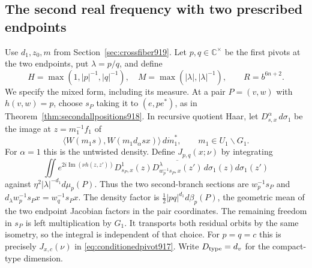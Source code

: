 \documentclass[a4paper,11pt]{article}
\theoremstyle{definition}
\theoremstyle{remark}
\numberwithin{equation}{section}
\begin{document}
\subsection{The second real frequency with two prescribed endpoints}
\label{sec:secondsharp920}

Use \(d_1,z_0,m\) from Section~\ref{sec:crossfiber919}.
Let \(p,q\in\mathbb C^\times\) be the first pivots at the two
endpoints, put \(\lambda=p/q\), and define
\[
 H=\max(1,|p|^{-1},|q|^{-1}),\quad M=\max(|\lambda|,|\lambda|^{-1}),
 \qquad R=b^{6n+2}.
\]
We specify the mixed form, including its measure. At a pair
\(P=(v,w)\) with \(h(v,w)=p\), choose \(s_P\) taking it to
\((e,p e^*)\), as in Theorem~\ref{thm:secondallpositions918}.
In recursive quotient Haar, let \(D^\alpha_{s,x}\,d\sigma_1\)
be the image at \(z=m_1^{-1} f_1\) of
\[
   \langle W(m_1s),W(m_1d_\alpha s x)\rangle\,d\dot m_1^*,
                \qquad m_1\in U_1\backslash G_1 .
\]
For \(\alpha=1\) this is the untwisted density. Define
\(J_{p,q}(x;\nu)\) by integrating
\[
 \iint e^{2i\operatorname{Im}(\nu h(z,z'))}
        D^1_{s_P,x}(z)\overline{D^\lambda_{w_p^{-1}s_P,x}(z')}
                                      \,d\sigma_1(z)d\sigma_1(z')
\]
against \(\eta^2|\lambda|^{-d_1}d\mu_p(P)\).
Thus the two second-branch sections are \(w_p^{-1}s_P\) and
\(d_\lambda w_p^{-1}s_Px=w_q^{-1}s_Px\). The density factor is
\(\tfrac12|pq|^{d_1}d\beta_p(P)\), the geometric mean of the
two endpoint Jacobian factors in the pair coordinates.
The remaining freedom in \(s_P\) is left multiplication by
\(G_1\). It transports both residual orbits by the same isometry,
so the integral is independent of that choice. For \(p=q=c\)
this is precisely \(J_{x,c}(\nu)\) in \eqref{eq:conditionedpivot917}.
Write \(D_{\rm type}=d_v\) for the compact-type dimension.
\end{document}
